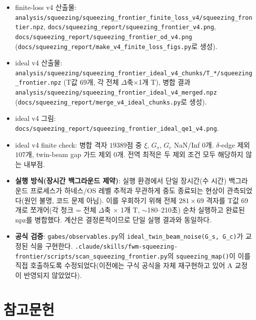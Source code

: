 \documentclass[11pt,a4paper]{article}
\begin{document}
\begin{itemize}[nosep]
\item finite-loss v4 산출물:
      \texttt{analysis/squeezing/squeezing\_frontier\_finite\_loss\_v4/squeezing\_frontier.npz},
      \texttt{docs/squeezing\_report/squeezing\_frontier\_v4.png},
      \texttt{docs/squeezing\_report/squeezing\_frontier\_od\_v4.png}
      (\texttt{docs/squeezing\_report/make\_v4\_finite\_loss\_figs.py}로 생성).
\item ideal v4 산출물:
      \texttt{analysis/squeezing/squeezing\_frontier\_ideal\_v4\_chunks/T\_*/squeezing\_frontier.npz}
      (T값 69개, 각 전체 $\Delta$축$\times$1개 T), 병합 결과
      \texttt{analysis/squeezing/squeezing\_frontier\_ideal\_v4\_merged.npz}
      (\texttt{docs/squeezing\_report/merge\_v4\_ideal\_chunks.py}로 생성).
\item ideal v4 그림:
      \texttt{docs/squeezing\_report/squeezing\_frontier\_ideal\_qe1\_v4.png}.
\item ideal v4 finite check: 병합 격자 $19389$점 중 $\xi$, $G_s$, $G_c$
      NaN/Inf $0$개. $\delta$-edge 제외 $107$개, twin-beam gap 가드 제외
      $0$개. 전역 최적은 두 제외 조건 모두 해당하지 않는 내부점.
\item \textbf{실행 방식(장시간 백그라운드 제약)}: 실행 환경에서 단일
      장시간(수 시간) 백그라운드 프로세스가 하네스/OS 레벨 추적과 무관하게
      중도 종료되는 현상이 관측되었다(원인 불명, 코드 문제 아님). 이를
      우회하기 위해 전체 $281\times69$ 격자를 T값 69개로 쪼개어(각 청크 =
      전체 $\Delta$축 $\times$ 1개 T, $\sim$180--210초) 순차 실행하고 완료된
      npz를 병합했다. 계산은 결정론적이므로 단일 실행 결과와 동일하다.
\item \textbf{공식 검증}: \texttt{gabes/observables.py}의
      \texttt{ideal\_twin\_beam\_noise(G\_s, G\_c)}가 교정된 식을 구현한다.
      \texttt{.claude/skills/fwm-squeezing-frontier/scripts/scan\_squeezing\_frontier.py}의
      \texttt{squeezing\_map()}이 이를 직접 호출하도록 수정되었다(이전에는
      구식 공식을 자체 재구현하고 있어 A 교정이 반영되지 않았었다).
\end{itemize}

\section{참고문헌}
\end{document}
